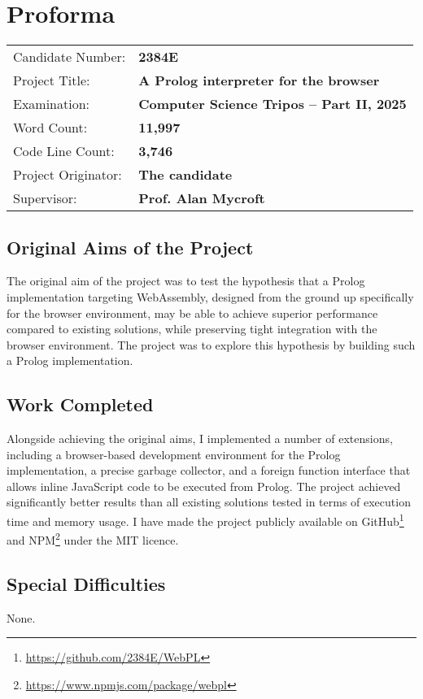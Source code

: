 \chapter*{Proforma}

{\large \begin{tabular}{ll}
Candidate Number: & {\bf 2384E} \\
Project Title: & {\bf A Prolog interpreter for the browser} \\
Examination: & {\bf Computer Science Tripos -- Part II, 2025} \\
Word Count: & {\bf 11,997}\footnotemark \\
Code Line Count: & {\bf 3,746}\footnotemark \\
Project Originator: & {\bf The candidate} \\
Supervisor: & {\bf Prof. Alan Mycroft}
\end{tabular}}


\section*{Original Aims of the Project}

The original aim of the project was to test the hypothesis that a Prolog implementation targeting WebAssembly, designed from the ground up specifically for the browser environment, may be able to achieve superior performance compared to existing solutions, while preserving tight integration with the browser environment. The project was to explore this hypothesis by building such a Prolog implementation.

\section*{Work Completed}

Alongside achieving the original aims, I implemented a number of extensions, including a browser-based development environment for the Prolog implementation, a precise garbage collector, and a foreign function interface that allows inline JavaScript code to be executed from Prolog. The project achieved significantly better results than all existing solutions tested in terms of execution time and memory usage. I have made the project publicly available on GitHub\footnote{\url{https://github.com/2384E/WebPL}} and NPM\footnote{\url{https://www.npmjs.com/package/webpl}} under the MIT licence.

\section*{Special Difficulties}

None.